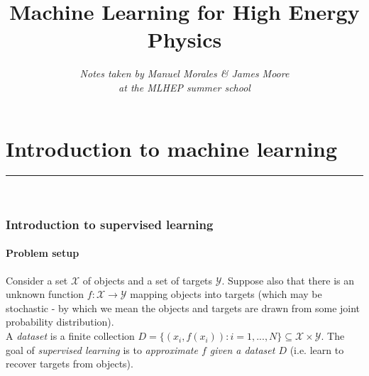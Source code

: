 



\title{\textbf{Machine Learning for High Energy Physics}}
\date{}
\author{\textit{Notes taken by Manuel Morales \& James Moore}\\ \textit{at the MLHEP summer school}}
\maketitle

\renewcommand*\contentsname{}
\tableofcontents


\newpage
\part{Introduction to machine learning}
\hrule
\noindent \\
\section{Introduction to supervised learning}

\subsection{Problem setup}

\begin{framedef}
Consider a set $\mathcal{X}$ of objects and a set of targets $\mathcal{Y}$. Suppose also that there is an unknown function $f : \mathcal{X} \rightarrow \mathcal{Y}$ mapping objects into targets (which may be stochastic - by which we mean the objects and targets are drawn from some joint probability distribution).\\

A \textit{dataset} is a finite collection $D = \{(x_i,f(x_i)) : i=1,...,N\} \subseteq \mathcal{X} \times \mathcal{Y}$. The goal of \textit{supervised learning} is to \textit{approximate $f$ given a dataset $D$} (i.e. learn to recover targets from objects). 
\end{framedef}


